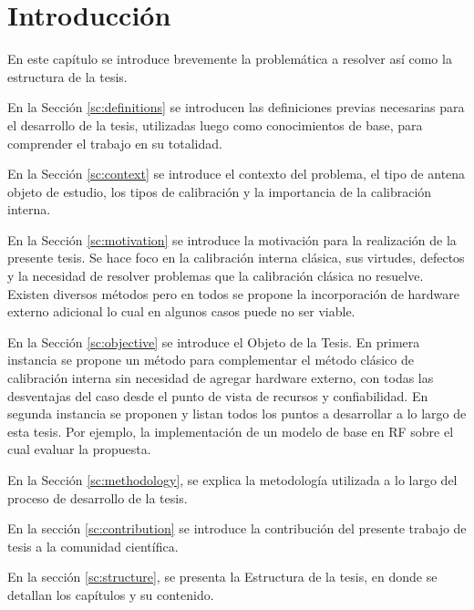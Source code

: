 
\chapter{Introducción} %

\label{ch:introduccion} %

En este capítulo se introduce brevemente la problemática a resolver así como la estructura de la tesis.

En la Sección \ref{sc:definitions} se introducen las definiciones previas necesarias para el desarrollo de la tesis, utilizadas
luego como conocimientos de base, para comprender el trabajo en su totalidad.

En la Sección \ref{sc:context} se introduce el contexto del problema, el tipo de antena objeto de estudio, los tipos de
calibración y la importancia de la calibración interna.

En la Sección \ref{sc:motivation} se introduce la motivación para la realización de la presente tesis. Se hace foco
en la calibración interna clásica, sus virtudes, defectos y la necesidad de resolver problemas que la calibración clásica no
resuelve. Existen diversos métodos pero en todos se propone la incorporación de hardware externo adicional lo cual en algunos 
casos puede no ser viable.

En la Sección \ref{sc:objective} se introduce el Objeto de la Tesis. En primera instancia se propone un método para 
complementar el método clásico de calibración interna sin necesidad de agregar hardware externo, con todas las 
desventajas del caso desde el punto de vista de recursos y confiabilidad. En segunda instancia se proponen y listan todos los 
puntos a desarrollar a lo largo de esta tesis. Por ejemplo, la implementación de un modelo de base en RF sobre el cual evaluar la 
propuesta.

En la Sección \ref{sc:methodology}, se explica la metodología utilizada a lo largo del proceso de desarrollo de la tesis.

En la sección \ref{sc:contribution} se introduce la contribución del presente trabajo de tesis a la comunidad científica.

En la sección \ref{sc:structure}, se presenta la Estructura de la tesis, en donde se detallan los capítulos y su contenido.


